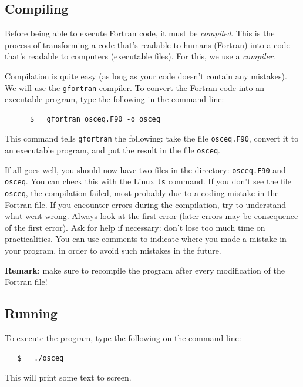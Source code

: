 \documentclass[a4paper]{article}
\begin{document}
\subsection{Compiling\label{sec:compile}}
%
\par
Before being able to execute Fortran code, it must be \emph{compiled}. This is the process of transforming a code that's readable to humans (Fortran) into a code that's readable to computers (executable files). For this, we use a \emph{compiler}.
%
\par
Compilation is quite easy (as long as your code doesn't contain any mistakes). We will use the \texttt{gfortran} compiler. To convert the Fortran code into an executable program, type the following in the command line:
%
\begin{verbatim}
	  $   gfortran osceq.F90 -o osceq
\end{verbatim}
%
This command tells \verb+gfortran+ the following: take the file \verb+osceq.F90+, convert it to an executable program, and put the result in the file \verb+osceq+.
%
\par
If all goes well, you should now have two files in the directory: \verb+osceq.F90+ and \verb+osceq+. You can check this with the Linux \verb+ls+ command. If you don't see the file \verb+osceq+, the compilation failed, most probably due to a coding mistake in the Fortran file. If you encounter errors during the compilation, try to understand what went wrong. Always look at the first error (later errors may be consequence of the first error). Ask for help if necessary: don't lose too much time on practicalities. You can use comments to indicate where you made a mistake in your program, in order to avoid such mistakes in the future.
%
\par
\textbf{Remark}: make sure to recompile the program after every modification of the Fortran file!
%
\subsection{Running\label{sec:run}}
%
\par
To execute the program, type the following on the command line:
%
\begin{verbatim}
   $   ./osceq
\end{verbatim}
%
This will print some text to screen.
%
\end{document}
